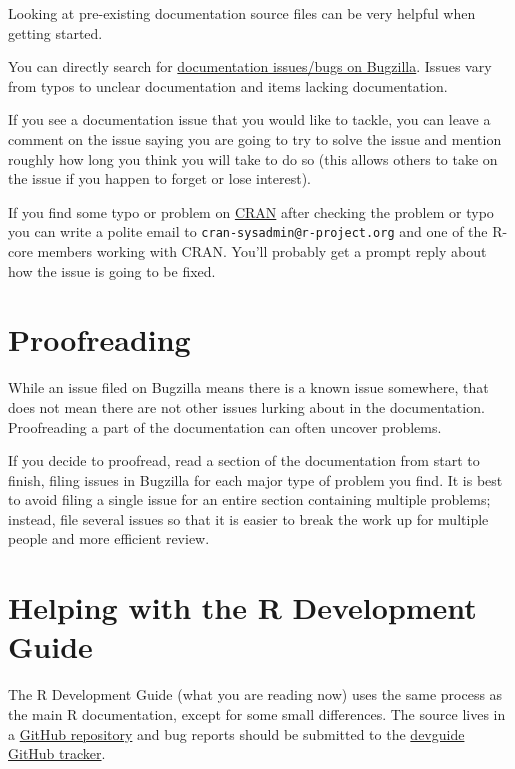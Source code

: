 \documentclass[
]{book}
\begin{document}
Looking at pre-existing documentation source files can be very helpful when getting started.

You can directly search for \href{https://bugs.r-project.org/buglist.cgi?component=Documentation&list_id=22501&product=R&resolution=---}{documentation issues/bugs on Bugzilla}. Issues vary from typos to unclear documentation and items lacking documentation.

If you see a documentation issue that you would like to tackle, you can leave a comment on the issue saying you are going to try to solve the issue and mention roughly how long you think you will take to do so (this allows others to take on the issue if you happen to forget or lose interest).

If you find some typo or problem on \href{https://cran.r-project.org}{CRAN} after checking the problem or typo you can write a polite email to \texttt{cran-sysadmin@r-project.org} and one of the R-core members working with CRAN. You'll probably get a prompt reply about how the issue is going to be fixed.

\section{Proofreading}\label{proofreading}

While an issue filed on Bugzilla means there is a known issue somewhere, that does not mean there are not other issues lurking about in the documentation. Proofreading a part of the documentation can often uncover problems.

If you decide to proofread, read a section of the documentation from start to finish, filing issues in Bugzilla for each major type of problem you find. It is best to avoid filing a single issue for an entire section containing multiple problems; instead, file several issues so that it is easier to break the work up for multiple people and more efficient review.

\section{Helping with the R Development Guide}\label{helping-with-the-r-development-guide}

The R Development Guide (what you are reading now) uses the same process as the main R documentation, except for some small differences. The source lives in a \href{https://github.com/r-devel/rdevguide/}{GitHub repository} and bug reports should be submitted to the \href{https://github.com/r-devel/rdevguide/issues}{devguide GitHub tracker}.
\end{document}
